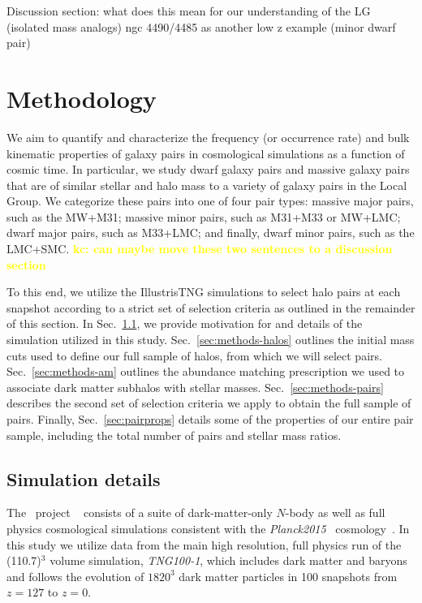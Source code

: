 \documentclass[twocolumn]{aastex631}
\newcommand{\kc}[1]{\textcolor{yellow}{\textbf{kc: #1}} }
\begin{document}
Discussion section: 
what does this mean for our understanding of the LG (isolated mass analogs) 
ngc 4490/4485 as another low z example (minor dwarf pair) 


 \section{Methodology}\label{sec:methods}
We aim to quantify and characterize the frequency (or occurrence rate) and bulk kinematic properties of galaxy pairs in cosmological simulations as a function of cosmic time. 
In particular, we study dwarf galaxy pairs and massive galaxy pairs that are of similar stellar and halo mass to a variety of galaxy pairs in the Local Group. 
We categorize these pairs into one of four pair types: massive major pairs, such as the MW+M31; massive minor pairs, such as M31+M33 or MW+LMC; dwarf major pairs, such as M33+LMC; and finally, dwarf minor pairs, such as the LMC+SMC.
\kc{can maybe move these two sentences to a discussion section}

To this end, we utilize the IllustrisTNG simulations to select halo pairs at each snapshot according to a strict set of selection criteria as outlined in the remainder of this section. 
In Sec.~\ref{sec:methods-sims}, we provide motivation for and details of the simulation utilized in this study.
Sec.~\ref{sec:methods-halos} outlines the initial mass cuts used to define our full sample of halos, from which we will select pairs.
Sec.~\ref{sec:methods-am} outlines the abundance matching prescription we used to associate dark matter subhalos with stellar masses.
Sec.~\ref{sec:methods-pairs} describes the second set of selection criteria we apply to obtain the full sample of pairs.
Finally, Sec.~\ref{sec:pairprops} details some of the properties of our entire pair sample, including the total number of pairs and stellar mass ratios.


    \subsection{Simulation details} \label{sec:methods-sims}
    The \tng\ project ~\citep{TNG1, TNG2, TNG3, TNG4, TNG5} consists of a suite of dark-matter-only $N$-body as well as full physics cosmological simulations consistent with the \textit{Planck2015} \lcdm\  cosmology~\citep{Planck2015}.
    In this study we utilize data from the main high resolution, full physics run of the (110.7\Mpc)$^3$ volume simulation, \textsl{TNG100-1}, which includes dark matter and baryons and follows the evolution of $1820^3$ dark matter particles in 100 snapshots from $z=127$ to $z=0$. 
\end{document}
